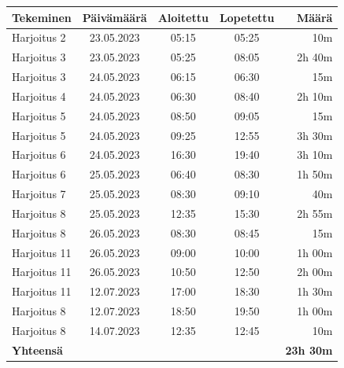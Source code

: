 \begin{table}[H]
  \centering
  \label{tab:other-studing-working-hours}
  \begin{tabular*}{\linewidth}{@{\extracolsep{\fill}} l c c c r }
    \textbf{Tekeminen} & \textbf{Päivämäärä} & \textbf{Aloitettu} & \textbf{Lopetettu} & \textbf{Määrä} \\
    \hline
    Harjoitus 2  & 23.05.2023 & 05:15 & 05:25 &    10m \\
    Harjoitus 3  & 23.05.2023 & 05:25 & 08:05 & 2h 40m \\
    Harjoitus 3  & 24.05.2023 & 06:15 & 06:30 &    15m \\
    Harjoitus 4  & 24.05.2023 & 06:30 & 08:40 & 2h 10m \\
    Harjoitus 5  & 24.05.2023 & 08:50 & 09:05 &    15m \\
    Harjoitus 5  & 24.05.2023 & 09:25 & 12:55 & 3h 30m \\
    Harjoitus 6  & 24.05.2023 & 16:30 & 19:40 & 3h 10m \\
    Harjoitus 6  & 25.05.2023 & 06:40 & 08:30 & 1h 50m \\
    Harjoitus 7  & 25.05.2023 & 08:30 & 09:10 &    40m \\
    Harjoitus 8  & 25.05.2023 & 12:35 & 15:30 & 2h 55m \\
    Harjoitus 8  & 26.05.2023 & 08:30 & 08:45 &    15m \\
    Harjoitus 11 & 26.05.2023 & 09:00 & 10:00 & 1h 00m \\
    Harjoitus 11 & 26.05.2023 & 10:50 & 12:50 & 2h 00m \\
    Harjoitus 11 & 12.07.2023 & 17:00 & 18:30 & 1h 30m \\
    Harjoitus  8 & 12.07.2023 & 18:50 & 19:50 & 1h 00m \\
    Harjoitus  8 & 14.07.2023 & 12:35 & 12:45 &    10m \\
    \hline
    \multicolumn{4}{l}{\textbf{Yhteensä}} & \textbf{23h 30m} \\
  \end{tabular*}
\end{table}
